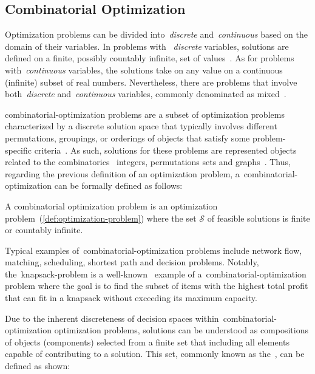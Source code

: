 \subsection{Combinatorial Optimization}
\label{sec:combinatorial-optimization}

Optimization problems can be divided into~\textit{discrete}
and~\textit{continuous} based on the domain of their variables. In problems with
~\textit{discrete} variables, solutions are defined on a finite, possibly
countably infinite, set of values~\cite{papadimitriou1998combinatorial}. As for
problems with~\textit{continuous} variables, the solutions take on any value on
a continuous (infinite) subset of real numbers. Nevertheless, there are problems
that involve both~\textit{discrete} and~\textit{continuous} variables, commonly
denominated as mixed~\cite{nocedal2006numerical}.

\acrfull{combinatorial-optimization} problems are a subset of optimization
problems characterized by a discrete solution space that typically involves
different permutations, groupings, or orderings of objects that satisfy some
problem-specific criteria~\cite{papadimitriou1998combinatorial,vieira2009uma}.
As such, solutions for these problems are represented objects related to the
combinatorics~\eg{} integers, permutations sets and
graphs~\cite{blummetaheuristics,yu2010combinatorial}. Thus, regarding the
previous definition of an optimization problem,
a~\acrshort{combinatorial-optimization} can be formally defined as follows:

\begin{definition}
  \label{def:combinatorial-optimization-problem}
  A combinatorial optimization problem is an optimization
  problem~(\ref{def:optimization-problem}) where the set $\mathcal{S}$ of
  feasible solutions is finite or countably infinite.
\end{definition}

Typical examples of~\acrshort{combinatorial-optimization} problems include
network flow, matching, scheduling, shortest path and decision problems.
Notably, the~\acrfull{knapsack-problem} is a
well-known~\cite{cacchiani2022knapsack, yu2010combinatorial,festa2014brief}
example of a~\acrshort{combinatorial-optimization} problem where the goal is to
find the subset of items with the highest total profit that can fit in a
knapsack without exceeding its maximum capacity.

Due to the inherent discreteness of decision spaces
within~\acrshort{combinatorial-optimization} optimization problems, solutions
can be understood as compositions of objects (components) selected from a finite
set that including all elements capable of contributing to a solution.  This
set, commonly known as the~, can be defined as shown:


